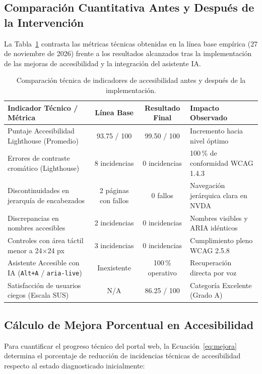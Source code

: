 \subsection{Comparación Cuantitativa Antes y Después de la Intervención}
La Tabla~\ref{tab:comparacion_resultados} contrasta las métricas técnicas obtenidas en la línea base empírica (27 de noviembre de 2026) frente a los resultados alcanzados tras la implementación de las mejoras de accesibilidad y la integración del asistente IA.

\begin{table}[htbp]
  \centering
  \small
  \caption{Comparación técnica de indicadores de accesibilidad antes y después de la implementación.}
  \label{tab:comparacion_resultados}
  \setlength{\tabcolsep}{4pt}
  \renewcommand{\arraystretch}{1.25}
  \begin{tabular}{|p{}|c|c|p{}|}
    \hline
    \textbf{Indicador Técnico / Métrica} & \textbf{Línea Base} & \textbf{Resultado Final} & \textbf{Impacto Observado} \\
    \hline
    Puntaje Accesibilidad Lighthouse (Promedio) & 93.75 / 100 & 99.50 / 100 & Incremento hacia nivel óptimo \\
    \hline
    Errores de contraste cromático (Lighthouse) & 8 incidencias & 0 incidencias & 100\,\% de conformidad WCAG 1.4.3 \\
    \hline
    Discontinuidades en jerarquía de encabezados & 2 páginas con fallos & 0 fallos & Navegación jerárquica clara en NVDA \\
    \hline
    Discrepancias en nombres accesibles & 2 incidencias & 0 incidencias & Nombres visibles y ARIA idénticos \\
    \hline
    Controles con área táctil menor a 24$\times$24 px & 3 incidencias & 0 incidencias & Cumplimiento pleno WCAG 2.5.8 \\
    \hline
    Asistente Accesible con IA (\texttt{Alt+A} / \texttt{aria-live}) & Inexistente & 100\,\% operativo & Recuperación directa por voz \\
    \hline
    Satisfacción de usuarios ciegos (Escala SUS) & N/A & 86.25 / 100 & Categoría Excelente (Grado A) \\
    \hline
  \end{tabular}
\end{table}

\subsection{Cálculo de Mejora Porcentual en Accesibilidad}
Para cuantificar el progreso técnico del portal web, la Ecuación~\ref{eq:mejora} determina el porcentaje de reducción de incidencias técnicas de accesibilidad respecto al estado diagnosticado inicialmente:

